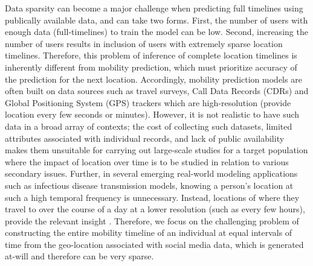 Data sparsity can become a major challenge when predicting full timelines using publically available data, and can take two forms.
First, the number of users with enough data (full-timelines) to train the model can be low. 
Second, increasing the number of users results in inclusion of users with extremely sparse location timelines. Therefore, this problem of inference of complete location timelines is inherently different from mobility prediction, which must prioritize accuracy of the prediction for the next location. Accordingly, mobility prediction models are often built on data sources such as travel surveys, Call Data Records (CDRs) and Global Positioning System (GPS) trackers which are high-resolution (provide location every few seconds or minutes). However, it is not realistic to have such data in a broad array of contexts; the cost of collecting such datasets, limited attributes associated with individual records, and lack of public availability makes them unsuitable for carrying out large-scale studies for a target population where the impact of location over time is to be studied in relation to various secondary issues. Further, in several emerging real-world modeling applications such as infectious disease transmission models, knowing a person's location at such a high temporal frequency is unnecessary. Instead, locations of where they travel to over the course of a day at a lower resolution (such as every few hours), provide the relevant insight \cite{31}. Therefore, we focus on the challenging problem of constructing the entire mobility timeline of an individual at equal intervals of time from the geo-location associated with social media data, which is generated at-will and therefore can be very sparse.

